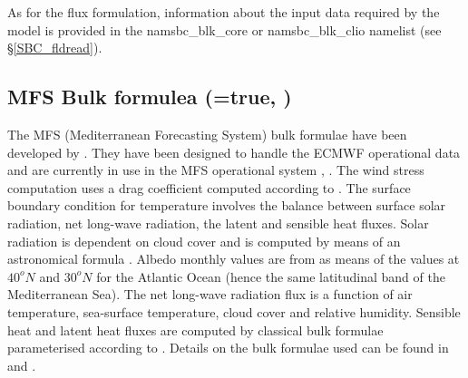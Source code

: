 As for the flux formulation, information about the input data required by the 
model is provided in the namsbc\_blk\_core or namsbc\_blk\_clio 
namelist (see \S\ref{SBC_fldread}). 

\subsection    [MFS Bulk formulea (\np{ln\_mfs}=true)]
		      {MFS Bulk formulea (=true, )}
\label{SBC_blk_mfs}

The MFS (Mediterranean Forecasting System) bulk formulae have been developed by
 \citet{Castellari_al_JMS1998}. 
They have been designed to handle the ECMWF operational data and are currently 
in use in the MFS operational system \citep{Tonani_al_OS08}, \citep{Oddo_al_OS09}.
The wind stress computation uses a drag coefficient computed according to \citet{Hellerman_Rosenstein_JPO83}.
The surface boundary condition for temperature involves the balance between surface solar radiation,
net long-wave radiation, the latent and sensible heat fluxes.
Solar radiation is dependent on cloud cover and is computed by means of
an astronomical formula \citep{Reed_JPO77}. Albedo monthly values are from \citet{Payne_JAS72} 
as means of the values at $40^{o}N$ and $30^{o}N$ for the Atlantic Ocean (hence the same latitudinal
band of the Mediterranean Sea). The net long-wave radiation flux
\citep{Bignami_al_JGR95} is a function of
air temperature, sea-surface temperature, cloud cover and relative humidity.
Sensible heat and latent heat fluxes are computed by classical
bulk formulae parameterised according to \citet{Kondo1975}.
Details on the bulk formulae used can be found in \citet{Maggiore_al_PCE98} and \citet{Castellari_al_JMS1998}.

